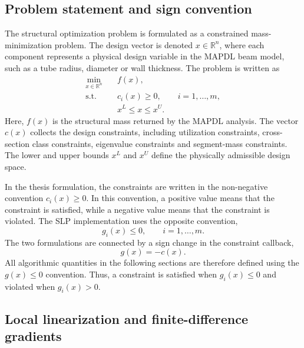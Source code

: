 \documentclass[11pt,a4paper]{article}
\begin{document}
\subsection{Problem statement and sign convention}
\label{sec:slpA:problem}

The structural optimization problem is formulated as a constrained
mass-minimization problem. The design vector is denoted
$x \in \mathbb{R}^n$, where each component represents a physical
design variable in the MAPDL beam model, such as a tube radius,
diameter or wall thickness. The problem is written as
\begin{equation}
\label{eq:appA_problem}
\begin{aligned}
    \min_{x \in \mathbb{R}^n} \quad & f(x), \\
    \text{s.t.} \quad
    & c_i(x) \geq 0,
    \qquad i = 1,\dots,m, \\
    & x^L \leq x \leq x^U .
\end{aligned}
\end{equation}
Here, $f(x)$ is the structural mass returned by the MAPDL analysis.
The vector $c(x)$ collects the design constraints, including
utilization constraints, cross-section class constraints,
eigenvalue constraints and segment-mass constraints. The lower and
upper bounds $x^L$ and $x^U$ define the physically admissible design
space.

In the thesis formulation, the constraints are written in the
non-negative convention $c_i(x) \geq 0$. In this convention, a
positive value means that the constraint is satisfied, while a
negative value means that the constraint is violated. The SLP
implementation uses the opposite convention,
\begin{equation}
\label{eq:appA_g_convention}
    g_i(x) \leq 0,
    \qquad i = 1,\dots,m .
\end{equation}
The two formulations are connected by a sign change in the constraint
callback,
\begin{equation}
\label{eq:appA_sign_flip}
    g(x) = -c(x).
\end{equation}
All algorithmic quantities in the following sections are therefore
defined using the $g(x) \leq 0$ convention. Thus, a constraint is
satisfied when $g_i(x) \leq 0$ and violated when $g_i(x)>0$.

\subsection{Local linearization and finite-difference gradients}
\label{sec:slpA:linearise}
\end{document}
